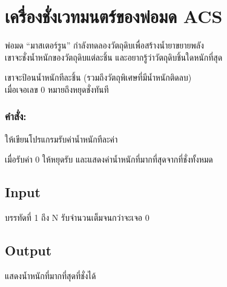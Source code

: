 \documentclass{article}
\begin{document}
\section*{เครื่องชั่งเวทมนตร์ของพ่อมด ACS}

พ่อมด ``มาสเตอร์รูน'' กำลังทดลองวัตถุดิบเพื่อสร้างน้ำยาขยายพลัง\\

เขาจะชั่งน้ำหนักของวัตถุดิบแต่ละชิ้น และอยากรู้ว่าวัตถุดิบชิ้นใดหนักที่สุด



เขาจะป้อนน้ำหนักทีละชิ้น (รวมถึงวัตถุพิเศษที่มีน้ำหนักติดลบ)\\

เมื่อเจอเลข 0 หมายถึงหยุดชั่งทันที



\subsubsection{คำสั่ง:}\label{uxe04uxe33uxe2auxe07}



ให้เขียนโปรแกรมรับค่าน้ำหนักทีละค่า



เมื่อรับค่า 0 ให้หยุดรับ และแสดงค่าน้ำหนักที่มากที่สุดจากที่ชั่งทั้งหมด



\subsection*{Input}
{บรรทัดที่ 1 ถึง N รับจำนวนเต็มจนกว่าจะเจอ 0}\\



\subsection*{Output}
{แสดงน้ำหนักที่มากที่สุดที่ชั่งได้}\\
\end{document}
